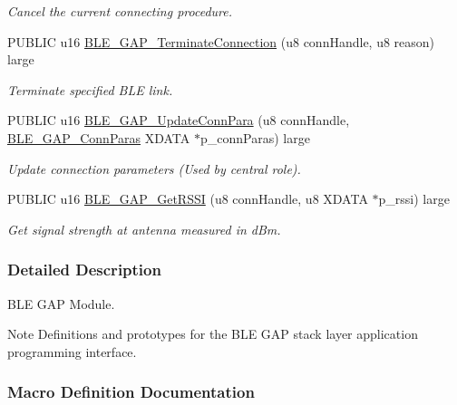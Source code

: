 \begin{DoxyCompactItemize}
\begin{DoxyCompactList}\small\item\em Cancel the current connecting procedure. \end{DoxyCompactList}\item 
P\+U\+B\+L\+IC u16 \hyperlink{group___b_l_e___g_a_p_gaac39ee6d4e2b816d24cc103642c120c7}{B\+L\+E\+\_\+\+G\+A\+P\+\_\+\+Terminate\+Connection} (u8 conn\+Handle, u8 reason) large
\begin{DoxyCompactList}\small\item\em Terminate specified B\+LE link. \end{DoxyCompactList}\item 
P\+U\+B\+L\+IC u16 \hyperlink{group___b_l_e___g_a_p_gad383e7528eefb37b1cd5dc721baffcba}{B\+L\+E\+\_\+\+G\+A\+P\+\_\+\+Update\+Conn\+Para} (u8 conn\+Handle, \hyperlink{struct_b_l_e___g_a_p___conn_paras}{B\+L\+E\+\_\+\+G\+A\+P\+\_\+\+Conn\+Paras} X\+D\+A\+TA $\ast$p\+\_\+conn\+Paras) large
\begin{DoxyCompactList}\small\item\em Update connection parameters (Used by central role). \end{DoxyCompactList}\item 
P\+U\+B\+L\+IC u16 \hyperlink{group___b_l_e___g_a_p_ga38013b7e414312598091c86b7d31b6ba}{B\+L\+E\+\_\+\+G\+A\+P\+\_\+\+Get\+R\+S\+SI} (u8 conn\+Handle, u8 X\+D\+A\+TA $\ast$p\+\_\+rssi) large
\begin{DoxyCompactList}\small\item\em Get signal strength at antenna measured in d\+Bm. \end{DoxyCompactList}\end{DoxyCompactItemize}


\subsubsection{Detailed Description}
B\+LE G\+AP Module. 

\begin{DoxyNote}{Note}
Definitions and prototypes for the B\+LE G\+AP stack layer application programming interface. 
\end{DoxyNote}


\subsubsection{Macro Definition Documentation}
